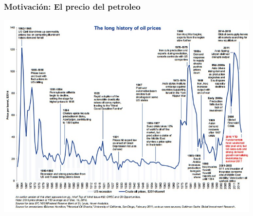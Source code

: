 \documentclass{beamer}
\begin{document}




\begin{frame}
\frametitle{Motivación: El precio del petroleo}
\centering
\includegraphics[scale=0.35]{Slides Principios de Economia/Figures/Tema_04.01_new.jpg}
\end{frame} 
\end{document}
